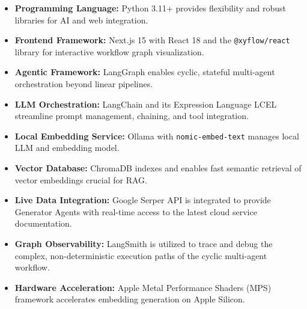 \begin{itemize}
    \item \textbf{Programming Language:} Python 3.11+ provides flexibility and robust libraries for AI and web integration.
    \item \textbf{Frontend Framework:} Next.js 15 with React 18 and the \texttt{@xyflow/react} library for interactive workflow graph visualization.
    \item \textbf{Agentic Framework:} LangGraph \cite{langgraph2024docs} enables cyclic, stateful multi-agent orchestration beyond linear pipelines.
    \item \textbf{LLM Orchestration:} LangChain \cite{langchain2024docs} and its Expression Language LCEL \cite{langchain2024lcel} streamline prompt management, chaining, and tool integration.
    \item \textbf{Local Embedding Service:} Ollama \cite{ollama2024web} with \texttt{nomic-embed-text} manages local LLM and embedding model.
    \item \textbf{Vector Database:} ChromaDB \cite{chromadb2024} indexes and enables fast semantic retrieval of vector embeddings crucial for RAG.
    \item \textbf{Live Data Integration:} Google Serper API is integrated to provide Generator Agents with real-time access to the latest cloud service documentation.
    \item \textbf{Graph Observability:} LangSmith is utilized to trace and debug the complex, non-deterministic execution paths of the cyclic multi-agent workflow.
    \item \textbf{Hardware Acceleration:} Apple Metal Performance Shaders (MPS) framework \cite{apple2024mps} accelerates embedding generation on Apple Silicon.
\end{itemize}

